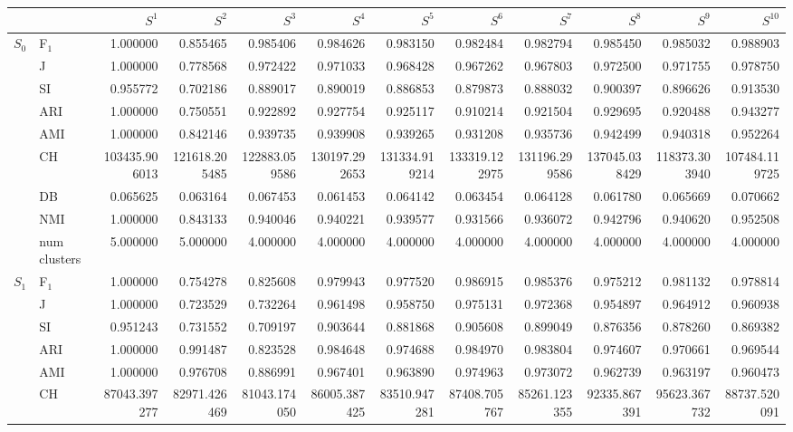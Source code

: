 \begin{tabular}{llrrrrrrrrrr}
\toprule
 &  & $S^{1}$ & $S^{2}$ & $S^{3}$ & $S^{4}$ & $S^{5}$ & $S^{6}$ & $S^{7}$ & $S^{8}$ & $S^{9}$ & $S^{10}$ \\
\midrule
\multirow[c]{9}{*}{$S_{0}$} & F$_1$ & 1.000000 & 0.855465 & 0.985406 & 0.984626 & 0.983150 & 0.982484 & 0.982794 & 0.985450 & 0.985032 & 0.988903 \\
 & J & 1.000000 & 0.778568 & 0.972422 & 0.971033 & 0.968428 & 0.967262 & 0.967803 & 0.972500 & 0.971755 & 0.978750 \\
 & SI & 0.955772 & 0.702186 & 0.889017 & 0.890019 & 0.886853 & 0.879873 & 0.888032 & 0.900397 & 0.896626 & 0.913530 \\
 & ARI & 1.000000 & 0.750551 & 0.922892 & 0.927754 & 0.925117 & 0.910214 & 0.921504 & 0.929695 & 0.920488 & 0.943277 \\
 & AMI & 1.000000 & 0.842146 & 0.939735 & 0.939908 & 0.939265 & 0.931208 & 0.935736 & 0.942499 & 0.940318 & 0.952264 \\
 & CH & 103435.906013 & 121618.205485 & 122883.059586 & 130197.292653 & 131334.919214 & 133319.122975 & 131196.299586 & 137045.038429 & 118373.303940 & 107484.119725 \\
 & DB & 0.065625 & 0.063164 & 0.067453 & 0.061453 & 0.064142 & 0.063454 & 0.064128 & 0.061780 & 0.065669 & 0.070662 \\
 & NMI & 1.000000 & 0.843133 & 0.940046 & 0.940221 & 0.939577 & 0.931566 & 0.936072 & 0.942796 & 0.940620 & 0.952508 \\
 & num clusters & 5.000000 & 5.000000 & 4.000000 & 4.000000 & 4.000000 & 4.000000 & 4.000000 & 4.000000 & 4.000000 & 4.000000 \\
\multirow[c]{9}{*}{$S_{1}$} & F$_1$ & 1.000000 & 0.754278 & 0.825608 & 0.979943 & 0.977520 & 0.986915 & 0.985376 & 0.975212 & 0.981132 & 0.978814 \\
 & J & 1.000000 & 0.723529 & 0.732264 & 0.961498 & 0.958750 & 0.975131 & 0.972368 & 0.954897 & 0.964912 & 0.960938 \\
 & SI & 0.951243 & 0.731552 & 0.709197 & 0.903644 & 0.881868 & 0.905608 & 0.899049 & 0.876356 & 0.878260 & 0.869382 \\
 & ARI & 1.000000 & 0.991487 & 0.823528 & 0.984648 & 0.974688 & 0.984970 & 0.983804 & 0.974607 & 0.970661 & 0.969544 \\
 & AMI & 1.000000 & 0.976708 & 0.886991 & 0.967401 & 0.963890 & 0.974963 & 0.973072 & 0.962739 & 0.963197 & 0.960473 \\
 & CH & 87043.397277 & 82971.426469 & 81043.174050 & 86005.387425 & 83510.947281 & 87408.705767 & 85261.123355 & 92335.867391 & 95623.367732 & 88737.520091 \\

\end{tabular}
